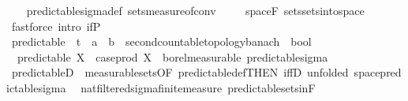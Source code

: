 \begin{isabellebody}
%
\isadelimproof
\ \ %
\endisadelimproof
%
\isatagproof
{}\isamarkupfalse%
\ predictable{\isacharunderscore}{\kern0pt}sigma{\isacharunderscore}{\kern0pt}def\ sets{\isacharunderscore}{\kern0pt}measure{\isacharunderscore}{\kern0pt}of{\isacharunderscore}{\kern0pt}conv\ \isanewline
\ \ \isamarkupfalse%
\ space{\isacharunderscore}{\kern0pt}F\ sets{\isachardot}{\kern0pt}sets{\isacharunderscore}{\kern0pt}into{\isacharunderscore}{\kern0pt}space\isanewline
\ \ \isamarkupfalse%
\ {\isacharparenleft}{\kern0pt}fastforce\ intro{\isacharbang}{\kern0pt}{\isacharcolon}{\kern0pt}\ if{\isacharunderscore}{\kern0pt}P{\isacharparenright}{\kern0pt}%
\endisatagproof
{\isafoldproof}%
%
\isadelimproof
\isanewline
%
\endisadelimproof
\isanewline
{}\isamarkupfalse%
\ predictable\ {\isacharcolon}{\kern0pt}{\isacharcolon}{\kern0pt}\ {\isachardoublequoteopen}{\isacharparenleft}{\kern0pt}{\isacharprime}{\kern0pt}t\ {\isasymRightarrow}\ {\isacharprime}{\kern0pt}a\ {\isasymRightarrow}\ {\isacharprime}{\kern0pt}b\ {\isacharcolon}{\kern0pt}{\isacharcolon}{\kern0pt}\ {\isacharbraceleft}{\kern0pt}second{\isacharunderscore}{\kern0pt}countable{\isacharunderscore}{\kern0pt}topology{\isacharcomma}{\kern0pt}banach{\isacharbraceright}{\kern0pt}{\isacharparenright}{\kern0pt}\ {\isasymRightarrow}\ bool{\isachardoublequoteclose}\ \isanewline
\ \ {\isachardoublequoteopen}predictable\ X\ {\isacharequal}{\kern0pt}\ {\isacharparenleft}{\kern0pt}case{\isacharunderscore}{\kern0pt}prod\ X\ {\isasymin}\ borel{\isacharunderscore}{\kern0pt}measurable\ {\isacharparenleft}{\kern0pt}predictable{\isacharunderscore}{\kern0pt}sigma{\isacharparenright}{\kern0pt}{\isacharparenright}{\kern0pt}{\isachardoublequoteclose}\isanewline
\isanewline
{}\isamarkupfalse%
\ predictableD\ {\isacharequal}{\kern0pt}\ measurable{\isacharunderscore}{\kern0pt}sets{\isacharbrackleft}{\kern0pt}OF\ predictable{\isacharunderscore}{\kern0pt}def{\isacharbrackleft}{\kern0pt}THEN\ iffD{}{\isacharbrackright}{\kern0pt}{\isacharcomma}{\kern0pt}\ unfolded\ space{\isacharunderscore}{\kern0pt}predictable{\isacharunderscore}{\kern0pt}sigma{\isacharbrackright}{\kern0pt}\isanewline
\isanewline
{}\isamarkupfalse%
\ {\isacharparenleft}{\kern0pt}\ nat{\isacharunderscore}{\kern0pt}filtered{\isacharunderscore}{\kern0pt}sigma{\isacharunderscore}{\kern0pt}finite{\isacharunderscore}{\kern0pt}measure{\isacharparenright}{\kern0pt}\ predictable{\isacharunderscore}{\kern0pt}sets{\isacharunderscore}{\kern0pt}in{\isacharunderscore}{\kern0pt}F{\isacharcolon}{\kern0pt}\isanewline

\end{isabellebody}
